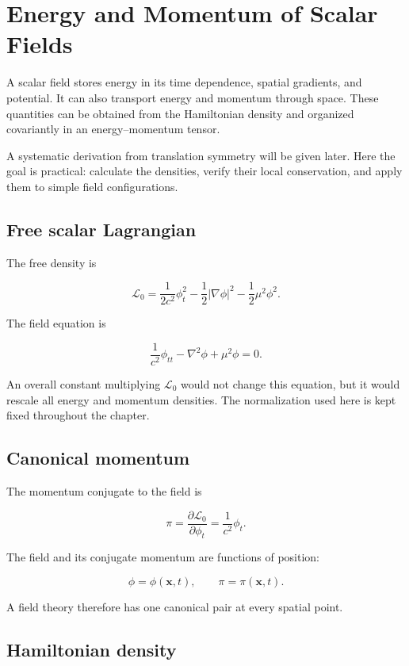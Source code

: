 \section{Energy and Momentum of Scalar Fields}
\label{sec:energy_and_momentum_of_scalar_fields}

A scalar field stores energy in its time dependence, spatial gradients, and potential. It can also transport energy and momentum through space. These quantities can be obtained from the Hamiltonian density and organized covariantly in an energy--momentum tensor.

A systematic derivation from translation symmetry will be given later. Here the goal is practical: calculate the densities, verify their local conservation, and apply them to simple field configurations.

\subsection{Free scalar Lagrangian}

The free density is

\[
\mathcal{L}_{0}
=
\frac{1}{2c^{2}}\phi_{t}^{2}
-
\frac{1}{2}|\nabla\phi|^{2}
-
\frac{1}{2}\mu^{2}\phi^{2}.
\]

The field equation is

\[
\frac{1}{c^{2}}\phi_{tt}
-
\nabla^{2}\phi
+
\mu^{2}\phi
=0.
\]

An overall constant multiplying \(\mathcal{L}_{0}\) would not change this equation, but it would rescale all energy and momentum densities. The normalization used here is kept fixed throughout the chapter.

\subsection{Canonical momentum}

The momentum conjugate to the field is

\[
\boxed{
\pi
=
\frac{\partial\mathcal{L}_{0}}
{\partial\phi_{t}}
=
\frac{1}{c^{2}}\phi_{t}
}.
\]

The field and its conjugate momentum are functions of position:

\[
\phi=\phi(\mathbf{x},t),
\qquad
\pi=\pi(\mathbf{x},t).
\]

A field theory therefore has one canonical pair at every spatial point.

\subsection{Hamiltonian density}

